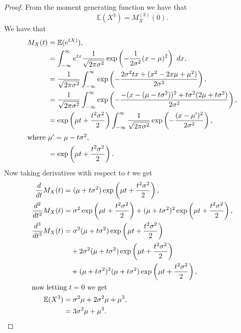 \documentclass{article}
\newcommand{\E}[1]{\mathbb{E}(#1)}
\begin{document}
\begin{proof}
    From the moment generating function we have that
    \begin{equation*}
        \E{X^3} = M_X^{(3)}(0).
    \end{equation*}
    We have that
    \begin{align*}
        M_X(t) & = \E{e^{tX)}},                                                                 \\
               & = \int_{-\infty}^\infty e^{tx} \frac{1}{\sqrt{2\pi\sigma^2}}
        \exp\left(-\frac{1}{2\sigma^2}(x-\mu)^2\right) \ dx,                                    \\
               & = \frac{1}{\sqrt{2\pi\sigma^2}}\int_{-\infty}^\infty
        \exp\left(-\frac{2\sigma^2tx+(x^2-2x\mu + \mu^2)}{2\sigma^2}\right),                    \\
               & = \frac{1}{\sqrt{2\pi\sigma^2}}\int_{-\infty}^\infty
        \exp\left(-\frac{-(x-(\mu-t\sigma^2))^2 + t\sigma^2(2\mu+t\sigma^2)}{2\sigma^2}\right), \\
               & = \exp\left(\mu t + \frac{t^2\sigma^2}{2}\right) \int_{-\infty}^\infty
        \frac{1}{\sqrt{2\pi\sigma^2}} \exp\left(-\frac{(x-\mu')^2}{2\sigma^2}\right),           \\
        \intertext{where $\mu' = \mu - t\sigma^2$,}
               & = \exp\left(\mu t + \frac{t^2\sigma^2}{2}\right).
    \end{align*}
    Now taking derivatives with respect to $t$ we get
    \begin{align*}
        \frac{d}{dt}M_X(t)     & = (\mu + t\sigma^2)\exp\left(\mu t + \frac{t^2\sigma^2}{2}\right),                          \\
        \frac{d^2}{dt^2}M_X(t) & = \sigma^2\exp\left(\mu t + \frac{t^2\sigma^2}{2}\right)
        + (\mu + t\sigma^2)^2\exp\left(\mu t + \frac{t^2\sigma^2}{2}\right),                                                 \\
        \frac{d^3}{dt^3}M_X(t) & =\sigma^2(\mu + t\sigma^2)\exp\left(\mu t + \frac{t^2\sigma^2}{2}\right)                    \\
                               & \quad + 2\sigma^2(\mu+t\sigma^2)\exp\left(\mu t + \frac{t^2\sigma^2}{2}\right)              \\
                               & \quad + (\mu + t\sigma^2)^2(\mu + t\sigma^2)\exp\left(\mu t + \frac{t^2\sigma^2}{2}\right), \\
        \intertext{now letting $t=0$ we get}
        \E{X^3}                & = \sigma^2\mu + 2\sigma^2\mu + \mu^3,                                                       \\
                               & = 3\sigma^2\mu + \mu^3.
    \end{align*}
\end{proof}
\end{document}
